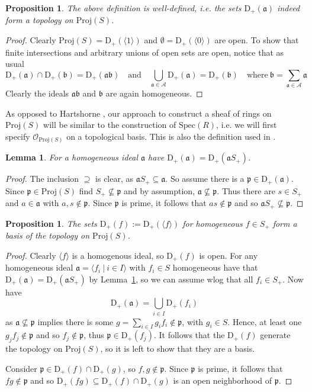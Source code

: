 \documentclass{scrartcl}
\newcommand{\D}[1]{\mathrm{D}_+(#1)}
\newcommand{\p}{\mathfrak{p}}
\renewcommand{\a}{\mathfrak{a}}
\renewcommand{\b}{\mathfrak{b}}
\newcommand{\Spec}{\mathrm{Spec}}
\newcommand{\Proj}{\mathrm{Proj}}
\renewcommand{\O}{\mathcal{O}}
\newcommand{\citestacks}[1]{\cite[\href{https://stacks.math.columbia.edu/tag/#1}{Tag #1}]{stacks}}
\newtheorem{prop}[subsection]{Proposition}
\newtheorem{lemma}[subsection]{Lemma}
\theoremstyle{definition}
\begin{document}
\begin{prop}
    The above definition is well-defined, i.e. the sets $\D{\a}$ indeed form a topology on $\Proj(S)$.
\end{prop}
\begin{proof}
    Clearly $\Proj(S) = \D{\langle 1 \rangle}$ and $\emptyset = \D{\langle 0 \rangle}$ are open.
    To show that finite intersections and arbitrary unions of open sets are open, notice that as usual
    \begin{equation*}
        \D{\a} \cap \D{\b} = \D{\a\b} \quad \text{and} \quad \bigcup_{\a \in \mathcal{A}} \D{\a} = \D{\b} \quad \text{where} \ \b = \sum_{\a \in \mathcal{A}} \a
    \end{equation*}
    Clearly the ideals $\a\b$ and $\b$ are again homogeneous.
\end{proof}
As opposed to Hartshorne \cite{hartshorne}, our approach to construct a sheaf of rings on $\Proj(S)$ will be similar to the construction of $\Spec(R)$, i.e. we will first specify $\O_{\Proj(S)}$ on a topological basis.
This is also the definition used in \citestacks{01M6}.
\begin{lemma}
    \label{prop:Splus_invariance}
    For a homogeneous ideal $\a$ have $\D{\a} = \D{\a S_+}$.
\end{lemma}
\begin{proof}
    The inclusion $\supseteq$ is clear, as $\a S_+ \subseteq \a$.
    So assume there is a $\p \in \D{\a}$.
    Since $\p \in \Proj(S)$ find $S_+ \not\subseteq \p$ and by assumption, $\a \not\subseteq \p$.
    Thus there are $s \in S_+$ and $a \in \a$ with $a, s \notin \p$.
    Since $\p$ is prime, it follows that $as \notin \p$ and so $\a S_+ \not\subseteq \p$.
\end{proof}
\begin{prop}
    \label{prop:basis_topology}
    The sets $\D{f} := \D{\langle f \rangle}$ for homogeneous $f \in S_+$ form a basis of the topology on $\Proj(S)$.
\end{prop}
\begin{proof}
    Clearly $\langle f \rangle$ is a homogenous ideal, so $\D{f}$ is open.
    For any homogeneous ideal $\a = \langle f_i \ | \ i \in I \rangle$ with $f_i \in S$ homogeneous have that $\D{\a} = \D{\a S_+}$ by Lemma~\ref{prop:Splus_invariance}, so we can assume wlog that all $f_i \in S_+$.
    Now have
    \begin{equation*}
        \D{\a} = \bigcup_{i \in I} \D{f_i}
    \end{equation*}
    as $\a \not\subseteq \p$ implies there is some $g = \sum_{i \in I} g_i f_i \notin \p$, with $g_i \in S$.
    Hence, at least one $g_j f_j \notin \p$ and so $f_j \notin \p$, thus $\p \in \D{f_j}$.
    It follows that the $\D{f}$ generate the topology on $\Proj(S)$, so it is left to show that they are a basis.

    Consider $\p \in \D{f} \cap \D{g}$, so $f, g \notin \p$.
    Since $\p$ is prime, it follows that $fg \notin \p$ and so $\D{fg} \subseteq \D{f} \cap \D{g}$ is an open neighborhood of $\p$.
\end{proof}
\end{document}
